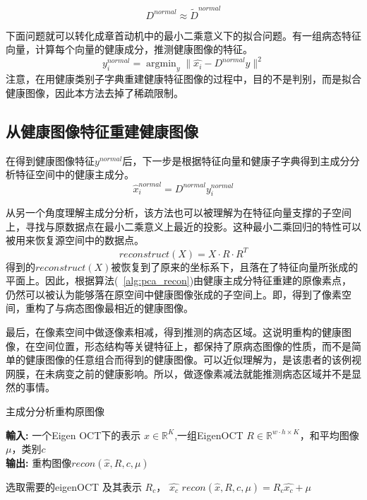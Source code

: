     \begin{equation}
        D^{normal} \approx \tilde{D}^{normal}
    \end{equation}

    下面问题就可以转化成章首动机中的最小二乘意义下的拟合问题。有一组病态特征向量，计算每个向量的健康成分，推测健康图像的特征。
    \begin{equation}
        y_i^{normal} = \mathop{\arg \min} _{y} \|\hat{x_i} - D^{normal} y\| ^ 2 
    \end{equation}
    注意，在用健康类别子字典重建健康特征图像的过程中，目的不是判别，而是拟合健康图像，因此本方法去掉了稀疏限制。
    


    \subsection{从健康图像特征重建健康图像}
    在得到健康图像特征$y^{normal}$后，下一步是根据特征向量和健康子字典得到主成分分析特征空间中的健康主成分。
    \begin{equation}
        \hat{x}_i^{normal} = D^{normal} y_i^{normal}
    \end{equation}

    从另一个角度理解主成分分析，该方法也可以被理解为在特征向量支撑的子空间上，寻找与原数据点在最小二乘意义上最近的投影。这种最小二乘回归的特性可以被用来恢复源空间中的数据点。
    \begin{equation}
        reconstruct(X) = X \cdot R \cdot R^T        
    \end{equation}
    得到的$reconstruct(X)$被恢复到了原来的坐标系下，且落在了特征向量所张成的平面上。因此，根据算法(~\ref{alg:pca_recon})由健康主成分特征重建的原像素点，仍然可以被认为能够落在原空间中健康图像张成的子空间上。即，得到了像素空间，重构了与病态图像最相近的健康图像。

    最后，在像素空间中做逐像素相减，得到推测的病态区域。这说明重构的健康图像，在空间位置，形态结构等关键特征上，都保持了原病态图像的性质，而不是简单的健康图像的任意组合而得到的健康图像。可以近似理解为，是该患者的该例视网膜，在未病变之前的健康影响。所以，做逐像素减法就能推测病态区域并不是显然的事情。

    \begin{algorithm}[htb]
        \caption{主成分分析重构原图像} %
        \hspace*{0.02in} {\bf 輸入:} %
        一个Eigen OCT下的表示 $\hat{x} \in \mathbb{R} ^{K} $,一组EigenOCT $R \in \mathbb{R} ^{w\cdot h \times K}$，和平均图像$\mu$，类别$c$\\
        \hspace*{0.02in} {\bf 输出:} %
        重构图像$recon(\hat{x}, R, c, \mu)$
        \begin{algorithmic}[1]
            \State 选取需要的eigenOCT 及其表示 $R_c$， $\hat{x_c}$
            \State $recon(\hat{x}, R, c, \mu) = R_c \hat{x_c} + \mu$
        \end{algorithmic}
        \label{alg:pca_recon}
    \end {algorithm}

